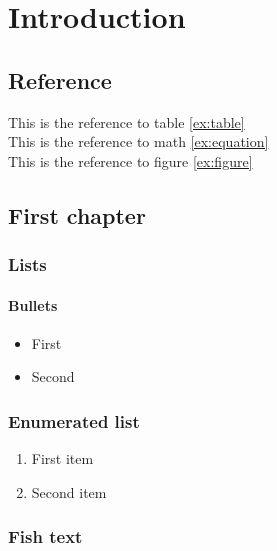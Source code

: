 \chapter{Introduction}
\section{Reference}
This is the reference to table \ref{ex:table}\\
This is the reference to math \ref{ex:equation}\\
This is the reference to figure \ref{ex:figure}
\section{First chapter}
\subsection{Lists}
\subsubsection{Bullets}

\begin{itemize}
	\item First
	\item Second
\end{itemize}

\subsection{Enumerated list}
\begin{enumerate}
	\item First item
	\item Second item
\end{enumerate}

\subsection{Fish text}
\lipsum